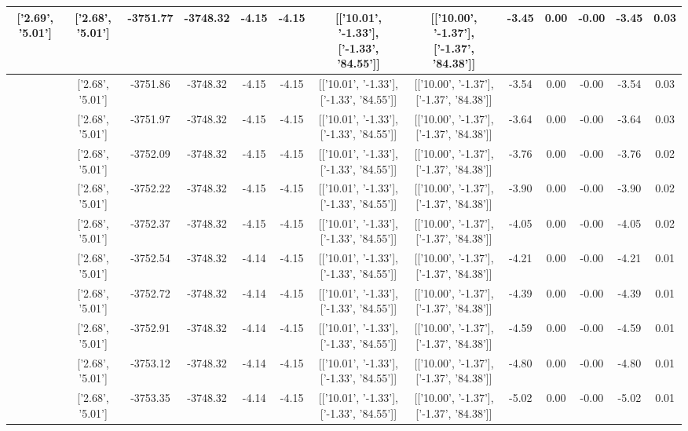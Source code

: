 \begin{table}[htbp]
\begin{adjustbox}{angle=90}
\begin{tabular}{|c|c|c|c|c|c|c|c|c|c|c|c|c|}
 ['2.69', '5.01'] & ['2.68', '5.01'] & -3751.77 & -3748.32 & -4.15 & -4.15 & [['10.01', '-1.33'], ['-1.33', '84.55']] & [['10.00', '-1.37'], ['-1.37', '84.38']] & -3.45 & 0.00 & -0.00 & -3.45 & 0.03\\ \hline
 ['2.69', '5.01'] & ['2.68', '5.01'] & -3751.86 & -3748.32 & -4.15 & -4.15 & [['10.01', '-1.33'], ['-1.33', '84.55']] & [['10.00', '-1.37'], ['-1.37', '84.38']] & -3.54 & 0.00 & -0.00 & -3.54 & 0.03\\ \hline
 ['2.69', '5.01'] & ['2.68', '5.01'] & -3751.97 & -3748.32 & -4.15 & -4.15 & [['10.01', '-1.33'], ['-1.33', '84.55']] & [['10.00', '-1.37'], ['-1.37', '84.38']] & -3.64 & 0.00 & -0.00 & -3.64 & 0.03\\ \hline
 ['2.70', '5.01'] & ['2.68', '5.01'] & -3752.09 & -3748.32 & -4.15 & -4.15 & [['10.01', '-1.33'], ['-1.33', '84.55']] & [['10.00', '-1.37'], ['-1.37', '84.38']] & -3.76 & 0.00 & -0.00 & -3.76 & 0.02\\ \hline
 ['2.70', '5.01'] & ['2.68', '5.01'] & -3752.22 & -3748.32 & -4.15 & -4.15 & [['10.01', '-1.33'], ['-1.33', '84.55']] & [['10.00', '-1.37'], ['-1.37', '84.38']] & -3.90 & 0.00 & -0.00 & -3.90 & 0.02\\ \hline
 ['2.70', '5.01'] & ['2.68', '5.01'] & -3752.37 & -3748.32 & -4.15 & -4.15 & [['10.01', '-1.33'], ['-1.33', '84.55']] & [['10.00', '-1.37'], ['-1.37', '84.38']] & -4.05 & 0.00 & -0.00 & -4.05 & 0.02\\ \hline
 ['2.70', '5.01'] & ['2.68', '5.01'] & -3752.54 & -3748.32 & -4.14 & -4.15 & [['10.01', '-1.33'], ['-1.33', '84.55']] & [['10.00', '-1.37'], ['-1.37', '84.38']] & -4.21 & 0.00 & -0.00 & -4.21 & 0.01\\ \hline
 ['2.70', '5.01'] & ['2.68', '5.01'] & -3752.72 & -3748.32 & -4.14 & -4.15 & [['10.01', '-1.33'], ['-1.33', '84.55']] & [['10.00', '-1.37'], ['-1.37', '84.38']] & -4.39 & 0.00 & -0.00 & -4.39 & 0.01\\ \hline
 ['2.70', '5.01'] & ['2.68', '5.01'] & -3752.91 & -3748.32 & -4.14 & -4.15 & [['10.01', '-1.33'], ['-1.33', '84.55']] & [['10.00', '-1.37'], ['-1.37', '84.38']] & -4.59 & 0.00 & -0.00 & -4.59 & 0.01\\ \hline
 ['2.70', '5.02'] & ['2.68', '5.01'] & -3753.12 & -3748.32 & -4.14 & -4.15 & [['10.01', '-1.33'], ['-1.33', '84.55']] & [['10.00', '-1.37'], ['-1.37', '84.38']] & -4.80 & 0.00 & -0.00 & -4.80 & 0.01\\ \hline
 ['2.70', '5.02'] & ['2.68', '5.01'] & -3753.35 & -3748.32 & -4.14 & -4.15 & [['10.01', '-1.33'], ['-1.33', '84.55']] & [['10.00', '-1.37'], ['-1.37', '84.38']] & -5.02 & 0.00 & -0.00 & -5.02 & 0.01\\ \hline

\end{tabular}
\end{adjustbox}
\end{table}

